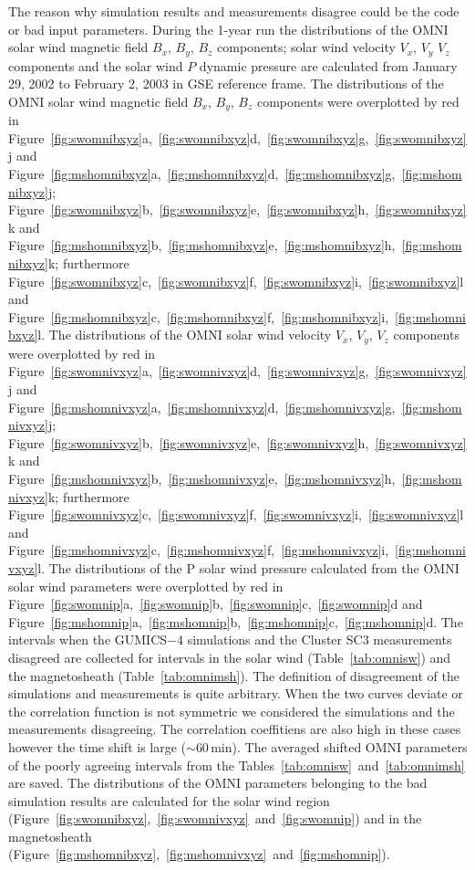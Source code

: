 \documentclass[draft]{agujournal2019}
\begin{document}
The reason why simulation results and measurements disagree could be the code or bad input parameters. During the 1-year run the distributions of the OMNI solar wind magnetic field $B_{x}$, $B_{y}$, $B_{z}$ components; solar wind velocity $V_{x}$, $V_{y}$ $V_{z}$ components and the solar wind $P$ dynamic pressure are calculated from January 29, 2002 to February 2, 2003 in GSE reference frame. The distributions of the OMNI solar wind magnetic field $B_{x}$, $B_{y}$, $B_{z}$ components were overplotted by red in Figure~\ref{fig:swomnibxyz}a,~\ref{fig:swomnibxyz}d,~\ref{fig:swomnibxyz}g,~\ref{fig:swomnibxyz}j and Figure~\ref{fig:mshomnibxyz}a,~\ref{fig:mshomnibxyz}d,~\ref{fig:mshomnibxyz}g,~\ref{fig:mshomnibxyz}j; Figure~\ref{fig:swomnibxyz}b,~\ref{fig:swomnibxyz}e,~\ref{fig:swomnibxyz}h,~\ref{fig:swomnibxyz}k and Figure~\ref{fig:mshomnibxyz}b,~\ref{fig:mshomnibxyz}e,~\ref{fig:mshomnibxyz}h,~\ref{fig:mshomnibxyz}k; furthermore Figure~\ref{fig:swomnibxyz}c,~\ref{fig:swomnibxyz}f,~\ref{fig:swomnibxyz}i,~\ref{fig:swomnibxyz}l and Figure~\ref{fig:mshomnibxyz}c,~\ref{fig:mshomnibxyz}f,~\ref{fig:mshomnibxyz}i,~\ref{fig:mshomnibxyz}l. The distributions of the OMNI solar wind velocity $V_{x}$, $V_{y}$, $V_{z}$ components were overplotted by red in Figure~\ref{fig:swomnivxyz}a,~\ref{fig:swomnivxyz}d,~\ref{fig:swomnivxyz}g,~\ref{fig:swomnivxyz}j and Figure~\ref{fig:mshomnivxyz}a,~\ref{fig:mshomnivxyz}d,~\ref{fig:mshomnivxyz}g,~\ref{fig:mshomnivxyz}j; Figure~\ref{fig:swomnivxyz}b,~\ref{fig:swomnivxyz}e,~\ref{fig:swomnivxyz}h,~\ref{fig:swomnivxyz}k and Figure~\ref{fig:mshomnivxyz}b,~\ref{fig:mshomnivxyz}e,~\ref{fig:mshomnivxyz}h,~\ref{fig:mshomnivxyz}k; furthermore Figure~\ref{fig:swomnivxyz}c,~\ref{fig:swomnivxyz}f,~\ref{fig:swomnivxyz}i,~\ref{fig:swomnivxyz}l and Figure~\ref{fig:mshomnivxyz}c,~\ref{fig:mshomnivxyz}f,~\ref{fig:mshomnivxyz}i,~\ref{fig:mshomnivxyz}l. The distributions of the P solar wind pressure calculated from the OMNI solar wind parameters were overplotted by red in Figure~\ref{fig:swomnip}a,~\ref{fig:swomnip}b,~\ref{fig:swomnip}c,~\ref{fig:swomnip}d and Figure~\ref{fig:mshomnip}a,~\ref{fig:mshomnip}b,~\ref{fig:mshomnip}c,~\ref{fig:mshomnip}d. The intervals when the GUMICS$-$4 simulations and the Cluster SC3 measurements disagreed are collected for intervals in the solar wind (Table~\ref{tab:omnisw}) and the magnetosheath (Table~\ref{tab:omnimsh}). The definition of disagreement of the simulations and measurements is quite arbitrary. When the two curves deviate or the correlation function is not symmetric we considered the simulations and the measurements disagreeing. The correlation coeffitiens are also high in these cases however the time shift is large ($\sim$60\,min). The averaged shifted OMNI parameters of the poorly agreeing intervals from the Tables~\ref{tab:omnisw}~and~\ref{tab:omnimsh} are saved. The distributions of the OMNI parameters belonging to the bad simulation results are calculated for the solar wind region (Figure~\ref{fig:swomnibxyz},~\ref{fig:swomnivxyz}~and~\ref{fig:swomnip}) and in the magnetosheath (Figure~\ref{fig:mshomnibxyz},~\ref{fig:mshomnivxyz}~and~\ref{fig:mshomnip}).
\end{document}

